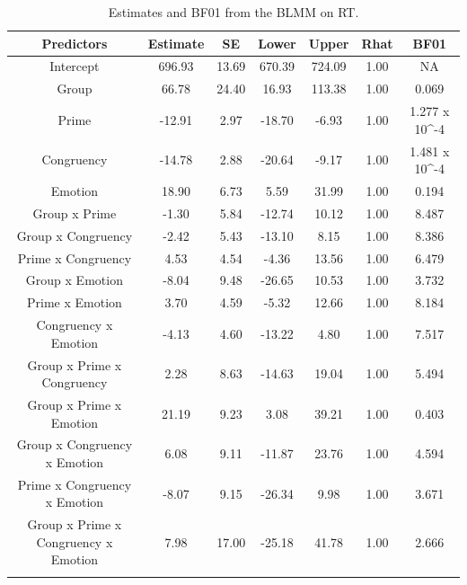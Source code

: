 \documentclass[
  11pt,
  english,
  ,doc,floatsintext]{apa6}
\begin{document}
\begin{table}[!h]

\begin{center}
\begin{threeparttable}

\caption{\label{tab:summaryBMgcpe}Estimates and BF01 from the BLMM on RT.}

\small{

\begin{tabular}{ccccccc}
\toprule
Predictors & \multicolumn{1}{c}{Estimate} & \multicolumn{1}{c}{SE} & \multicolumn{1}{c}{Lower} & \multicolumn{1}{c}{Upper} & \multicolumn{1}{c}{Rhat} & \multicolumn{1}{c}{BF01}\\
\midrule
Intercept & 696.93 & 13.69 & 670.39 & 724.09 & 1.00 & NA\\
Group & 66.78 & 24.40 & 16.93 & 113.38 & 1.00 & 0.069\\
Prime & -12.91 & 2.97 & -18.70 & -6.93 & 1.00 & 1.277 x 10\textasciicircum{}-4\\
Congruency & -14.78 & 2.88 & -20.64 & -9.17 & 1.00 & 1.481 x 10\textasciicircum{}-4\\
Emotion & 18.90 & 6.73 & 5.59 & 31.99 & 1.00 & 0.194\\
Group x Prime & -1.30 & 5.84 & -12.74 & 10.12 & 1.00 & 8.487\\
Group x Congruency & -2.42 & 5.43 & -13.10 & 8.15 & 1.00 & 8.386\\
Prime x Congruency & 4.53 & 4.54 & -4.36 & 13.56 & 1.00 & 6.479\\
Group x Emotion & -8.04 & 9.48 & -26.65 & 10.53 & 1.00 & 3.732\\
Prime x Emotion & 3.70 & 4.59 & -5.32 & 12.66 & 1.00 & 8.184\\
Congruency x Emotion & -4.13 & 4.60 & -13.22 & 4.80 & 1.00 & 7.517\\
Group x Prime x Congruency & 2.28 & 8.63 & -14.63 & 19.04 & 1.00 & 5.494\\
Group x Prime x Emotion & 21.19 & 9.23 & 3.08 & 39.21 & 1.00 & 0.403\\
Group x Congruency x Emotion & 6.08 & 9.11 & -11.87 & 23.76 & 1.00 & 4.594\\
Prime x Congruency x Emotion & -8.07 & 9.15 & -26.34 & 9.98 & 1.00 & 3.671\\
Group x Prime x Congruency x Emotion & 7.98 & 17.00 & -25.18 & 41.78 & 1.00 & 2.666\\
\bottomrule
\addlinespace
\end{tabular}

}
\end{threeparttable}
\end{center}
\end{table}
\end{document}
